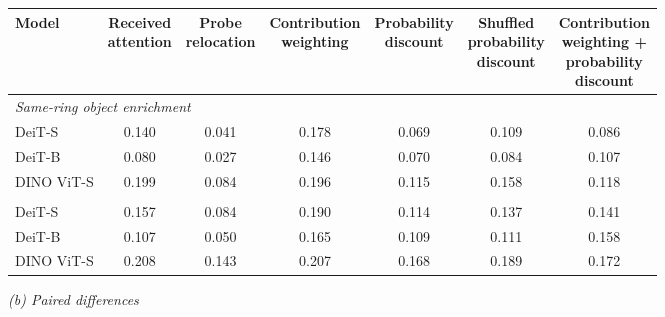 \begin{tabular}{lcccccc}
\toprule
Model & \makecell[c]{Received \\ attention} & \makecell[c]{Probe \\ relocation} & \makecell[c]{Contribution \\ weighting} & \makecell[c]{Probability \\ discount} & \makecell[c]{Shuffled \\ probability \\ discount} & \makecell[c]{Contribution \\ weighting + \\ probability \\ discount} \\
\midrule
\multicolumn{7}{l}{\textit{Same-ring object enrichment}} \\
DeiT-S & 0.140 & 0.041 & 0.178 & 0.069 & 0.109 & 0.086 \\
DeiT-B & 0.080 & 0.027 & 0.146 & 0.070 & 0.084 & 0.107 \\
DINO ViT-S & 0.199 & 0.084 & 0.196 & 0.115 & 0.158 & 0.118 \\
\addlinespace[3pt]
\multicolumn{7}{l}{\textit{Image-specific ClickMe alignment}} \\
DeiT-S & 0.157 & 0.084 & 0.190 & 0.114 & 0.137 & 0.141 \\
DeiT-B & 0.107 & 0.050 & 0.165 & 0.109 & 0.111 & 0.158 \\
DINO ViT-S & 0.208 & 0.143 & 0.207 & 0.168 & 0.189 & 0.172 \\
\bottomrule
\end{tabular}
\par\medskip\textit{(b) Paired differences}\par\smallskip
